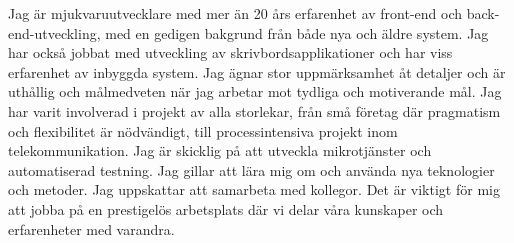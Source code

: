 \documentclass{cv-stylish}
\begin{document}
\begin{center} %



\vspace{1.0cm} %



\begin{adjustwidth}{1cm}{1cm}


Jag är mjukvaruutvecklare med mer än 20 års erfarenhet av
front-end och back-end-utveckling, med en gedigen bakgrund
från både nya och äldre system.
Jag har också jobbat med utveckling av skrivbordsapplikationer och har
viss erfarenhet av inbyggda system.
Jag ägnar stor uppmärksamhet åt
detaljer och är uthållig och målmedveten när jag arbetar mot
tydliga och motiverande mål. Jag har varit involverad i projekt av
alla storlekar, från små företag där pragmatism och flexibilitet
är nödvändigt, till processintensiva projekt inom telekommunikation.
Jag är skicklig på att utveckla mikrotjänster och automatiserad
testning. Jag gillar att lära mig om och använda nya teknologier
och metoder. Jag uppskattar att samarbeta med kollegor. Det är
viktigt för mig att jobba på en prestigelös arbetsplats där vi delar
våra kunskaper och erfarenheter med varandra.




\end{adjustwidth}
\end{center}
\end{document}
